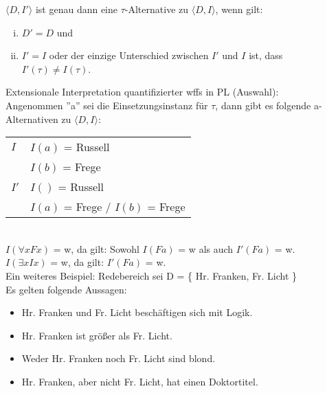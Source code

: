 \documentclass{scrartcl}
\begin{document}
$ \langle D,I' \rangle $ ist genau dann eine $ \tau $-Alternative zu $ \langle D,I \rangle $, wenn gilt:
\begin{enumerate}[(i)]
	\item $ D' = D $ und
	\item $ I' = I $ oder der einzige Unterschied zwischen $ I' $ und $ I $ ist, dass $ I'(\tau) \neq I(\tau) $.
\end{enumerate}

Extensionale Interpretation quantifizierter wffs in PL (Auswahl): \\

Angenommen ''a'' sei die Einsetzungsinstanz für $ \tau $, dann gibt es folgende a-Alternativen zu $ \langle D,I \rangle $: \\
\begin{tabularx}{\linewidth}{l l}
	$ I $ & $ I(a) $ = Russell \\
	& $ I(b) $ = Frege \\
	$ I' $ & $ I() $ = Russell \\
	& $ I(a) $ = Frege / $ I(b) $ = Frege
\end{tabularx} \\

$ I(\forall x Fx) $ = w, da gilt: Sowohl $ I(Fa) $ = w als auch $ I'(Fa) $ = w. \\
$ I(\exists x Ix) $ = w, da gilt: $ I'(Fa) $ = w. \\

Ein weiteres Beispiel: Redebereich sei D = \{ Hr. Franken, Fr. Licht \} \\

Es gelten folgende Aussagen:
\begin{itemize}
	\item Hr. Franken und Fr. Licht beschäftigen sich mit Logik.
	\item Hr. Franken ist größer als Fr. Licht.
	\item Weder Hr. Franken noch Fr. Licht sind blond.
	\item Hr. Franken, aber nicht Fr. Licht, hat einen Doktortitel.
\end{itemize}
\end{document}
